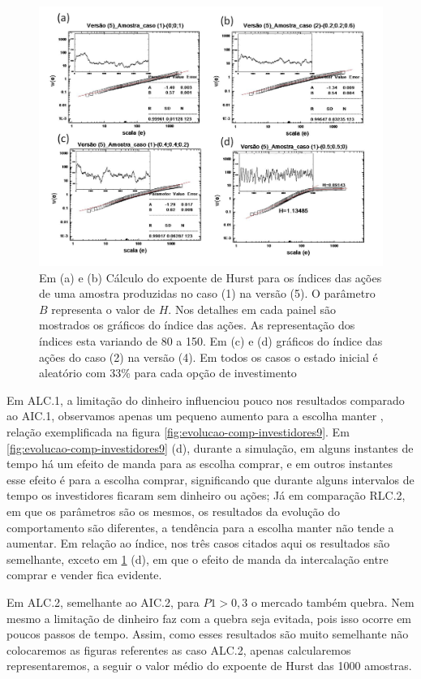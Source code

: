 \documentclass[brazil,ruledheader]{abnt}
\begin{document}
\begin{figure}[!h]
\centering
\includegraphics[width=.7\linewidth]{Figuras/34.jpg}
\caption{Em (a) e (b) Cálculo do expoente de Hurst para os índices das ações de
uma amostra produzidas no caso (1) na  versão (5).  O parâmetro $B$ representa o
valor de $H$. Nos detalhes em cada painel são mostrados os gráficos do índice
das ações. As representação dos índices esta variando de 80 a 150.  Em (c) e (d)
gráficos do índice das ações do caso (2) na versão (4). Em todos os casos o
estado inicial é aleatório com 33\% para cada opção de investimento}
\label{fig:calculo-exp-hurst12}
\end{figure}

Em ALC.1, a limitação do dinheiro influenciou
pouco nos resultados comparado ao AIC.1, observamos apenas um pequeno
aumento para a escolha manter , relação exemplificada na figura
\ref{fig:evolucao-comp-investidores9}. Em \ref{fig:evolucao-comp-investidores9}
(d), durante a simulação, em alguns instantes de tempo há um efeito de manda
para as escolha comprar, e em outros instantes esse efeito é para a escolha
comprar, significando que durante alguns intervalos de tempo os
investidores ficaram sem dinheiro ou ações; Já em comparação RLC.2, em que os
parâmetros são os mesmos, os resultados da evolução do comportamento são
diferentes,  a tendência para a escolha manter não tende a aumentar. Em relação
ao índice, nos três casos citados aqui os resultados são semelhante, exceto  em
\ref{fig:calculo-exp-hurst12} (d), em que o efeito de manda da intercalação
entre comprar e vender fica evidente.     

Em ALC.2, semelhante ao AIC.2, para $P1>0,3$ o
mercado também quebra. Nem mesmo a limitação de dinheiro faz com a quebra seja
evitada, pois isso ocorre em poucos passos de tempo. Assim, como esses
resultados são muito semelhante não colocaremos as figuras referentes as caso
ALC.2, apenas calcularemos representaremos, a seguir o valor médio
do expoente de Hurst das 1000 amostras. 
\end{document}
